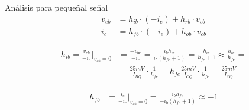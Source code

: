\begin{frame}[allowframebreaks]{Análisis para pequeñal señal}
\begin{align*}
    v_{eb} &= h_{ib} \cdot (-i_e) + h_{rb} \cdot v_{cb} \\[6pt]
    i_c &= h_{fb} \cdot (-i_e) + h_{ob} \cdot v_{cb}
\end{align*}

\begin{align*}
    h_{ib} = \frac{v_{eb}}{-i_e} \bigg|_{v_{cb}=0} &= \frac{-v_{be}}{-i_e} = \frac{i_b h_{ie}}{i_b(h_{fe}+1)}=\frac{h_{ie}}{h_{fe}+1} \approx \frac{h_{ie}}{h_{fe}} =\\[6pt]
    &= \frac{25mV}{I_{BQ}} \cdot \frac{1}{h_{fe}} = h_{fe} \frac{25mV}{I_{CQ}} \cdot \frac{1}{h_{fe}} = \frac{25mV}{I_{CQ}}
\end{align*}

\begin{align*}
     h_{fb} &= \frac{i_c}{-i_e} \bigg|_{v_{cb}=0} = \frac{i_{b}h_{fe}}{-i_b({h_{fe}+1})} \approx -1
\end{align*}
 

\end{frame}
